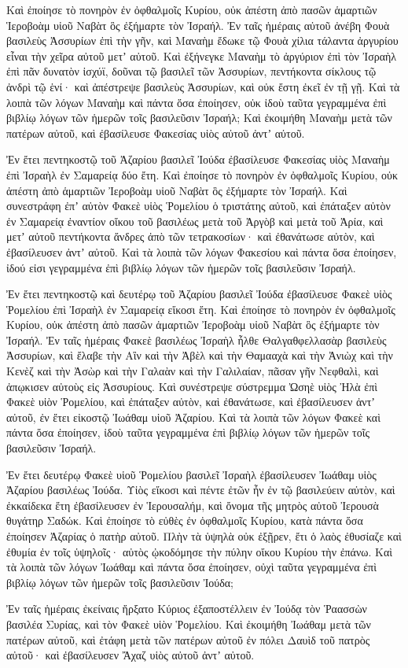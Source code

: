 {Καὶ ἐποίησε τὸ πονηρὸν ἐν ὀφθαλμοῖς Κυρίου, οὐκ ἀπέστη ἀπὸ πασῶν ἁμαρτιῶν Ἱεροβοὰμ υἱοῦ Ναβὰτ ὃς ἐξήμαρτε τὸν Ἰσραήλ.
Ἐν ταῖς ἡμέραις αὐτοῦ ἀνέβη Φουὰ βασιλεὺς Ἀσσυρίων ἐπὶ τὴν γῆν, καὶ Μαναὴμ ἔδωκε τῷ Φουὰ χίλια τάλαντα ἀργυρίου εἶναι τὴν χεῖρα αὐτοῦ μετʼ αὐτοῦ.
Καὶ ἐξήνεγκε Μαναὴμ τὸ ἀργύριον ἐπὶ τὸν Ἰσραὴλ ἐπὶ πᾶν δυνατὸν ἰσχύϊ, δοῦναι τῷ βασιλεῖ τῶν Ἀσσυρίων, πεντήκοντα σίκλους τῷ ἀνδρὶ τῷ ἑνί· καὶ ἀπέστρεψε βασιλεὺς Ἀσσυρίων, καὶ οὐκ ἔστη ἐκεῖ ἐν τῇ γῇ.
Καὶ τὰ λοιπὰ τῶν λόγων Μαναὴμ καὶ πάντα ὅσα ἐποίησεν, οὐκ ἰδοὺ ταῦτα γεγραμμένα ἐπὶ βιβλίῳ λόγων τῶν ἡμερῶν τοῖς βασιλεῦσιν Ἰσραήλ;
Καὶ ἐκοιμήθη Μαναὴμ μετὰ τῶν πατέρων αὐτοῦ, καὶ ἐβασίλευσε Φακεσίας υἱὸς αὐτοῦ ἀντʼ αὐτοῦ.
\par }{\PP {}Ἐν ἔτει πεντηκοστῷ τοῦ Ἀζαρίου βασιλεῖ Ἰούδα ἐβασίλευσε Φακεσίας υἱὸς Μαναὴμ ἐπὶ Ἰσραὴλ ἐν Σαμαρείᾳ δύο ἔτη.
Καὶ ἐποίησε τὸ πονηρὸν ἐν ὀφθαλμοῖς Κυρίου, οὐκ ἀπέστη ἀπὸ ἁμαρτιῶν Ἰεροβοὰμ υἱοῦ Ναβὰτ ὃς ἐξήμαρτε τὸν Ἰσραήλ.
Καὶ συνεστράφη ἐπʼ αὐτὸν Φακεὲ υἱὸς Ῥομελίου ὁ τριστάτης αὐτοῦ, καὶ ἐπάταξεν αὐτὸν ἐν Σαμαρείᾳ ἐναντίον οἴκου τοῦ βασιλέως μετὰ τοῦ Ἀργὸβ καὶ μετὰ τοῦ Ἀρία, καὶ μετʼ αὐτοῦ πεντήκοντα ἄνδρες ἀπὸ τῶν τετρακοσίων· καὶ ἐθανάτωσε αὐτὸν, καὶ ἐβασίλευσεν ἀντʼ αὐτοῦ.
Καὶ τὰ λοιπὰ τῶν λόγων Φακεσίου καὶ πάντα ὅσα ἐποίησεν, ἰδού εἰσι γεγραμμένα ἐπὶ βιβλίῳ λόγων τῶν ἡμερῶν τοῖς βασιλεῦσιν Ἰσραήλ.
\par }{\PP {}Ἐν ἔτει πεντηκοστῷ καὶ δευτέρῳ τοῦ Ἀζαρίου βασιλεῖ Ἰούδα ἐβασίλευσε Φακεὲ υἱὸς Ῥομελίου ἐπὶ Ἰσραὴλ ἐν Σαμαρείᾳ εἴκοσι ἔτη.
Καὶ ἐποίησε τὸ πονηρὸν ἐν ὀφθαλμοῖς Κυρίου, οὐκ ἀπέστη ἀπὸ πασῶν ἁμαρτιῶν Ἰεροβοὰμ υἱοῦ Ναβὰτ ὃς ἐξήμαρτε τὸν Ἰσραήλ.
Ἐν ταῖς ἡμέραις Φακεὲ βασιλέως Ἰσραὴλ ἦλθε Θαλγαθφελλασὰρ βασιλεὺς Ἀσσυρίων, καὶ ἔλαβε τὴν Αἲν καὶ τὴν Ἀβὲλ καὶ τὴν Θαμααχὰ καὶ τὴν Ἀνιὼχ καὶ τὴν Κενὲζ καὶ τὴν Ἀσὼρ καὶ τὴν Γαλαὰν καὶ τὴν Γαλιλαίαν, πᾶσαν γῆν Νεφθαλὶ, καὶ ἀπῳκισεν αὐτοὺς εἰς Ἀσσυρίους.
Καὶ συνέστρεψε σύστρεμμα Ὠσηὲ υἱὸς Ἠλὰ ἐπὶ Φακεὲ υἱὸν Ῥομελίου, καὶ ἐπάταξεν αὐτὸν, καὶ ἐθανάτωσε, καὶ ἐβασίλευσεν ἀντʼ αὐτοῦ, ἐν ἔτει εἰκοστῷ Ἰωάθαμ υἱοῦ Ἀζαρίου.
Καὶ τὰ λοιπὰ τῶν λόγων Φακεὲ καὶ πάντα ὅσα ἐποίησεν, ἰδοὺ ταῦτα γεγραμμένα ἐπὶ βιβλίῳ λόγων τῶν ἡμερῶν τοῖς βασιλεῦσιν Ἰσραήλ.
\par }{\PP {}Ἐν ἔτει δευτέρῳ Φακεὲ υἱοῦ Ῥομελίου βασιλεῖ Ἰσραὴλ ἐβασίλευσεν Ἰωάθαμ υἱὸς Ἀζαρίου βασιλέως Ἰούδα.
Υἱὸς εἴκοσι καὶ πέντε ἐτῶν ἦν ἐν τῷ βασιλεύειν αὐτὸν, καὶ ἐκκαίδεκα ἔτη ἐβασίλευσεν ἐν Ἱερουσαλήμ, καὶ ὄνομα τῆς μητρὸς αὐτοῦ Ἰερουσὰ θυγάτηρ Σαδώκ.
Καὶ ἐποίησε τὸ εὐθὲς ἐν ὀφθαλμοῖς Κυρίου, κατὰ πάντα ὅσα ἐποίησεν Ἀζαρίας ὁ πατὴρ αὐτοῦ.
Πλὴν τὰ ὑψηλὰ οὐκ ἐξῇρεν, ἔτι ὁ λαὸς ἐθυσίαζε καὶ ἐθυμία ἐν τοῖς ὑψηλοῖς· αὐτὸς ᾠκοδόμησε τὴν πύλην οἴκου Κυρίου τὴν ἐπάνω.
Καὶ τὰ λοιπὰ τῶν λόγων Ἰωάθαμ καὶ πάντα ὅσα ἐποίησεν, οὐχὶ ταῦτα γεγραμμένα ἐπὶ βιβλίῳ λόγων τῶν ἡμερῶν τοῖς βασιλεῦσιν Ἰούδα;
\par }{\PP {}Ἐν ταῖς ἡμέραις ἐκείναις ἤρξατο Κύριος ἐξαποστέλλειν ἐν Ἰούδᾳ τὸν Ῥαασσὼν βασιλέα Συρίας, καὶ τὸν Φακεὲ υἱὸν Ῥομελίου.
Καὶ ἐκοιμήθη Ἰωάθαμ μετὰ τῶν πατέρων αὐτοῦ, καὶ ἐτάφη μετὰ τῶν πατέρων αὐτοῦ ἐν πόλει Δαυὶδ τοῦ πατρὸς αὐτοῦ· καὶ ἐβασίλευσεν Ἄχαζ υἱὸς αὐτοῦ ἀντʼ αὐτοῦ.

}
